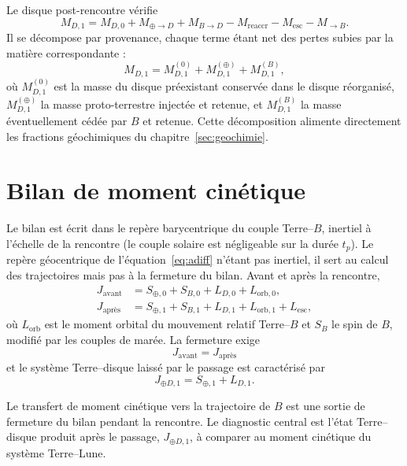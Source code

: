 \documentclass[11pt,a4paper,openany]{report}
\begin{document}
Le disque post-rencontre vérifie
\begin{equation}
M_{D,1}=M_{D,0}+M_{\oplus\to D}+M_{B\to D}-M_{\mathrm{reaccr}}-M_{\mathrm{esc}}-M_{\to B}.
\label{eq:bilanM1}
\end{equation}
Il se décompose par provenance, chaque terme étant net des pertes subies par la matière
correspondante :
\begin{equation}
M_{D,1}=M_{D,1}^{(0)}+M_{D,1}^{(\oplus)}+M_{D,1}^{(B)},
\label{eq:provenance}
\end{equation}
où $M_{D,1}^{(0)}$ est la masse du disque préexistant conservée dans le disque réorganisé,
$M_{D,1}^{(\oplus)}$ la masse proto-terrestre injectée et retenue, et $M_{D,1}^{(B)}$ la masse
éventuellement cédée par $B$ et retenue. Cette décomposition alimente directement les fractions
géochimiques du chapitre~\ref{sec:geochimie}.

\section{Bilan de moment cinétique}

Le bilan est écrit dans le repère barycentrique du couple Terre--$B$, inertiel à l'échelle de la
rencontre (le couple solaire est négligeable sur la durée $t_{p}$). Le repère
géocentrique de l'équation~\eqref{eq:adiff} n'étant pas inertiel, il sert au calcul des
trajectoires mais pas à la fermeture du bilan. Avant et après la rencontre,
\begin{align}
J_{\mathrm{avant}}&=S_{\oplus,0}+S_{B,0}+L_{D,0}+L_{\mathrm{orb},0},
\label{eq:Javant}\\
J_{\text{après}}&=S_{\oplus,1}+S_{B,1}+L_{D,1}+L_{\mathrm{orb},1}+L_{\mathrm{esc}},
\label{eq:Japres}
\end{align}
où $L_{\mathrm{orb}}$ est le moment orbital du mouvement relatif Terre--$B$ et $S_B$ le spin de $B$,
modifié par les couples de marée. La fermeture exige
\begin{equation}
\boxed{\;J_{\mathrm{avant}}=J_{\text{après}}\;}
\label{eq:fermeture}
\end{equation}
et le système Terre--disque laissé par le passage est caractérisé par
\begin{equation}
J_{\oplus D,1}=S_{\oplus,1}+L_{D,1}.
\label{eq:J1}
\end{equation}

\begin{controle}
Le transfert de moment cinétique vers la trajectoire de $B$ est une sortie de fermeture du bilan
pendant la rencontre. Le diagnostic central est l'état Terre--disque produit après le passage,
$J_{\oplus D,1}$, à comparer au moment cinétique du système Terre--Lune.
\end{controle}
\end{document}
